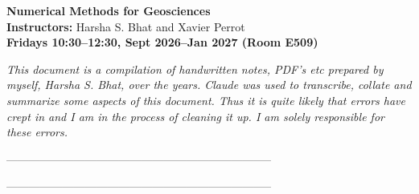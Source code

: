 \documentclass[10pt]{article}
\begin{document}
\pagestyle{custom}


\vspace*{\fill}
\begin{center}
\LARGE {\bf Numerical Methods for Geosciences\\[6pt]}
\normalsize
\textbf{Instructors:} Harsha S. Bhat and Xavier Perrot \\[12pt]
\textbf{Fridays 10:30--12:30, Sept 2026--Jan 2027 (Room E509)} \\[12pt]
\end{center}
\vspace{1cm}

\emph{This document is a compilation of handwritten notes, PDF's etc prepared by myself, Harsha S. Bhat, over the years. Claude was used to transcribe, collate and summarize some aspects of this document. Thus it is quite likely that errors have crept in and I am in the process of cleaning it up. I am solely responsible for these errors.}

\vspace*{\fill}


\clearpage
\normalsize
%


\begingroup
  \setlength{\parskip}{0pt}%
  \tableofcontents
\endgroup
\newpage

%

{}


% 
 -----------------------------------------------------------------------

 \newpage
 
 -----------------------------------------------------------------------
 
\end{document}
